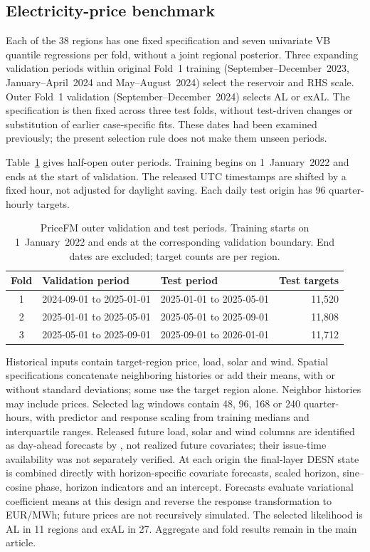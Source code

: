 \documentclass[12pt,letterpaper]{article}
\newcommand{\TableStyle}{\footnotesize\setlength{\tabcolsep}{4pt}\renewcommand{\arraystretch}{1.08}}
\numberwithin{suppalgorithm}{section}
\numberwithin{equation}{section}
\numberwithin{table}{section}
\numberwithin{figure}{section}
\begin{document}
\clearpage
\subsection{Electricity-price benchmark}
\label{subsec:supp_pricefm_diagnostics}

Each of the 38 regions has one fixed specification and seven univariate
VB quantile regressions per fold, without a joint regional posterior.
Three expanding validation periods within original Fold~1 training
(September--December~2023, January--April~2024 and May--August~2024)
select the reservoir and RHS scale. Outer Fold~1 validation
(September--December~2024) selects AL or exAL. The specification is
then fixed across three test folds, without test-driven changes or
substitution of earlier case-specific fits. These dates had been examined
previously; the present selection rule does not make them unseen periods.

Table~\ref{tab:supp-pricefm-fold-design} gives half-open outer periods.
Training begins on 1~January~2022 and ends at the start of validation.
The released UTC timestamps are shifted by a fixed hour, not adjusted
for daylight saving. Each daily test origin has 96 quarter-hourly targets.

\begin{table}[!htbp]
\centering
\TableStyle
\caption{PriceFM outer validation and test periods. Training starts on
1~January~2022 and ends at the corresponding validation boundary. End dates
are excluded; target counts are per region.}
\label{tab:supp-pricefm-fold-design}
\begin{tabular}{@{}cllr@{}}
\toprule
Fold & Validation period & Test period & Test targets \\
\midrule
1 & 2024-09-01 to 2025-01-01 & 2025-01-01 to 2025-05-01 & 11,520 \\
2 & 2025-01-01 to 2025-05-01 & 2025-05-01 to 2025-09-01 & 11,808 \\
3 & 2025-05-01 to 2025-09-01 & 2025-09-01 to 2026-01-01 & 11,712 \\
\bottomrule
\end{tabular}
\end{table}

Historical inputs contain target-region price, load, solar and wind.
Spatial specifications concatenate neighboring histories or add their
means, with or without standard deviations; some use the target region
alone. Neighbor histories may include prices. Selected lag windows contain
48, 96, 168 or 240 quarter-hours, with predictor and response scaling
from training medians and interquartile ranges.
Released future load, solar and wind columns are identified as day-ahead
forecasts by \citet{YuEtAl2026PriceFM}, not realized future covariates;
their issue-time availability was not separately verified.
At each origin the final-layer DESN state is combined directly with
horizon-specific covariate forecasts, scaled horizon, sine--cosine phase,
horizon indicators and an intercept. Forecasts evaluate variational
coefficient means at this design and reverse the response transformation
to EUR/MWh; future prices are not recursively simulated.
The selected likelihood is AL in 11 regions and exAL in 27. Aggregate
and fold results remain in the main article.



\end{document}
